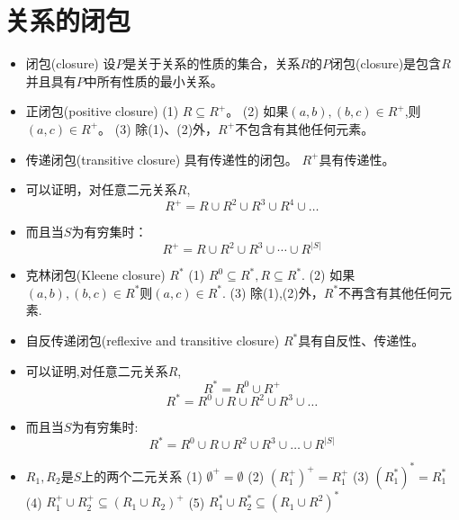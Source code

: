 \section{关系的闭包}
\begin{itemize}
	\item 闭包(closure)
		\subitem 设$P$是关于关系的性质的集合，关系$R$的$P$闭包(closure)是包含$R$并且具有$P$中所有性质的最小关系。
	\item 正闭包(positive closure)
		\subitem(1) $R\subseteq R^{+}$。
		\subitem(2) 如果$(a,b),(b,c) \in R^{+}$,则$(a,c)\in R^{+}$。
		\subitem(3) 除(1)、(2)外，$R^{+}$不包含有其他任何元素。
	\item 传递闭包(transitive closure)
	   	\subitem{-} 具有传递性的闭包。
	   	\subitem{-} $R^{+}$具有传递性。
	\item 可以证明，对任意二元关系$R$,
			$$R^{+} = R\cup R^2 \cup R^3 \cup R^4 \cup \dots$$
	\item 而且当$S$为有穷集时：
			\[R^{+} = R\cup R^2 \cup R^3 \cup \cdots \cup R^{|S|} \]
	\item 克林闭包(Kleene closure) $R^{\ast}$
		\subitem(1) $R^0 \subseteq R^*,R\subseteq R^{\ast}$.
		\subitem(2) 如果$(a,b),(b,c)\in R^{\ast}$则$(a,c)\in R^{\ast}$.
		\subitem(3) 除(1),(2)外，$R^{\ast}$不再含有其他任何元素.
	\item 自反传递闭包(reflexive and transitive closure)
		\subitem $R^{\ast}$具有自反性、传递性。
	\item 可以证明,对任意二元关系$R$,
	\[R^{\ast} =R^{0}\cup R^{+} \]
	\[R^{\ast} =R^{0}\cup R\cup R^{2}\cup R^{3}\cup \dots \]
	\item 而且当$S$为有穷集时:
	\[R^{\ast} =R^{0}\cup R\cup R^{2}\cup R^{3}\cup \dots \cup R^{|S|} \]
	\item $R_1,R_2$是$S$上的两个二元关系
		\subitem(1) $\emptyset^{+}=\emptyset$
		\subitem(2) $(R_1^{+})^{+} = R_1^{+}$
		\subitem(3) $(R_1^{\ast})^{\ast} = R_1^{\ast}$
		\subitem(4) $R_1^{+}\cup R_2^{+} \subseteq (R_1 \cup R_2)^{+}$
		\subitem(5) $R_1^{\ast}\cup R_2^{\ast} \subseteq (R_1\cup R^2)^{\ast}$		
\end{itemize}

